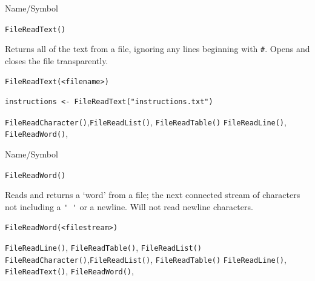 \begin{desc}{Name/Symbol}
\item[Name/Symbol]	\verb+FileReadText()+

\item[Description]	Returns all of the text from a file, ignoring any lines
		beginning with \verb+#+. Opens and closes the file transparently.

\item[Usage]
\begin{verbatim}
FileReadText(<filename>)
\end{verbatim}

\item[Example]
\begin{verbatim}
instructions <- FileReadText("instructions.txt")
\end{verbatim}

\item[See Also]	
	\verb+FileReadCharacter()+,\verb+FileReadList()+, \verb+FileReadTable()+
	\verb+FileReadLine()+, 	\verb+FileReadWord()+,

\end{desc}


\begin{desc}{Name/Symbol}
\item[Name/Symbol]	\verb+FileReadWord()+

\item[Description]	Reads and returns  a `word' from a file; the next
		connected stream of characters not including a \verb+' '+
		or a newline. Will not read newline characters.

\item[Usage]
\begin{verbatim}
FileReadWord(<filestream>)
\end{verbatim}

\item[Example]	

\item[See Also]	\verb+FileReadLine()+, \verb+FileReadTable()+, \verb+FileReadList()+
	\verb+FileReadCharacter()+,\verb+FileReadList()+, \verb+FileReadTable()+
	\verb+FileReadLine()+, 	\verb+FileReadText()+, 	\verb+FileReadWord()+,

\end{desc}

